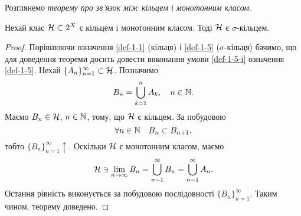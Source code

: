 Розглянемо \emph{теорему про зв'язок між кільцем і монотонним класом}.

\begin{theorem}
	\label{th-1-2}
	Нехай клас $\mathcal H\subset 2^X$ є кільцем і монотонним класом. Тоді $\mathcal H$ є $\sigma$-кільцем.
\end{theorem}

\begin{proof}
	Порівнюючи означення \ref{def-1-1} (кільця) і \ref{def-1-5} ($\sigma$-кільця) бачимо, що для доведення теореми досить довести виконання умови  \ref{def-1-5-i} означення \ref{def-1-5}. Нехай $\{A_n\}_{n=1}^\infty\subset \mathcal H$. Позначимо
	$$
	B_n=\bigcup_{k=1}^n A_k,\quad n\in{\mathbb N}.
	$$
	Маємо $B_n\in\mathcal H$, $n\in{\mathbb N}$, тому, що $\mathcal H$ є кільцем. За побудовою 
	$$
	\forall n\in{\mathbb N}\quad B_n\subset B_{n+1}.
	$$
	тобто $\{B_n\}_{n=1}^\infty\uparrow$. Оскільки $\mathcal H$ є монотонним класом, маємо
	$$
	\mathcal H\ni\lim_{n\to\infty} B_n=\bigcup_{n=1}^\infty B_n= \bigcup_{n=1}^\infty A_n.
	$$
	Остання рівність виконується за побудовою послідовності $\{B_n\}_{n=1}^\infty$. Таким чином, теорему доведено.
\end{proof}

